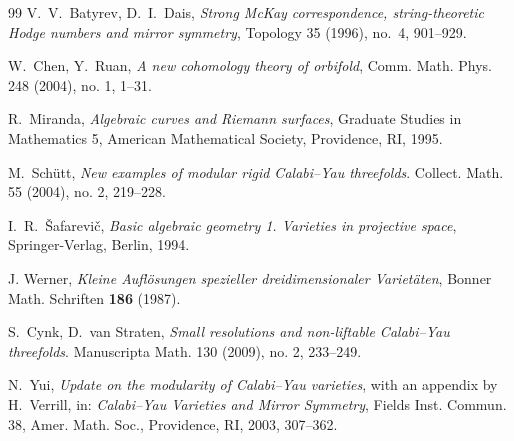 \documentclass[a4paper]{amsart}
\theoremstyle{plain}
\theoremstyle{definition}
\theoremstyle{remark}
\numberwithin{equation}{section}
\begin{document}
\begin{thebibliography}{99}
	 V.~V.~Batyrev, D.~I.~Dais,
	\emph{Strong McKay correspondence, string-theoretic Hodge numbers and
	mirror symmetry},
	Topology 35 (1996), no.~4, 901--929.

	 W.~Chen, Y.~Ruan,
	\emph{A new cohomology theory of orbifold},
	Comm. Math. Phys. 248 (2004), no. 1, 1--31.

	 R.~Miranda,
	\emph{Algebraic curves and Riemann surfaces},
	Graduate Studies in Mathematics 5, American Mathematical Society, Providence, RI, 1995.

	M.~Sch\"utt, {\em New examples of modular rigid
	Calabi--Yau threefolds}.  Collect. Math.  55  (2004),  no. 2,
	219--228.

	 I.~R.~\v Safarevi\v c,
	\emph{Basic algebraic geometry 1. Varieties in projective space},
	Springer-Verlag, Berlin, 1994.

	 J. Werner, \emph{Kleine Aufl\"osungen spezieller
		dreidimensionaler Variet\"aten}, Bonner Math. Schriften \textbf{186}
	(1987).

	 S.~Cynk, D.~van Straten,
	\emph{Small resolutions and non-liftable Calabi--Yau threefolds}.
	Manuscripta Math. 130 (2009), no. 2, 233--249.

	 N.~Yui,
	\emph{Update on the modularity of Calabi--Yau varieties}, with an
	appendix by H.~Verrill,
	in: \emph{Calabi--Yau Varieties and Mirror Symmetry},
	Fields Inst. Commun. 38, Amer. Math. Soc., Providence, RI, 2003,
	307--362.
\end{thebibliography}


\FloatBarrier
\endgroup
\end{document}
